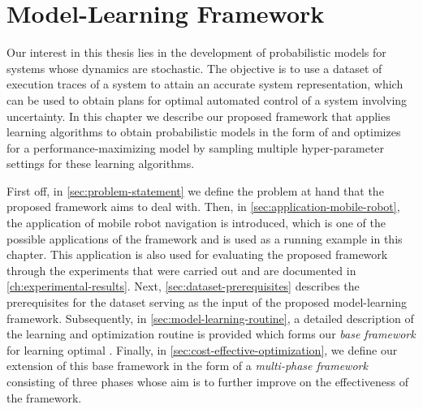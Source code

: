 \chapter{Model-Learning Framework}
\label{ch:methodology}

Our interest in this thesis lies in the development of probabilistic models for systems whose dynamics are stochastic.
The objective is to use a dataset of execution traces of a system to attain an accurate system representation, which can be used to obtain plans for optimal automated control of a system involving uncertainty.
In this chapter we describe our proposed framework that applies learning algorithms to obtain probabilistic models in the form of  and optimizes for a performance-maximizing model by sampling multiple hyper-parameter settings for these learning algorithms.

First off, in \autoref{sec:problem-statement} we define the problem at hand that the proposed framework aims to deal with.
Then, in \autoref{sec:application-mobile-robot}, the application of mobile robot navigation is introduced, which is one of the possible applications of the framework and is used as a running example in this chapter.
This application is also used for evaluating the proposed framework through the experiments that were carried out and are documented in \autoref{ch:experimental-results}.
Next, \autoref{sec:dataset-prerequisites} describes the prerequisites for the dataset serving as the input of the proposed model-learning framework.
Subsequently, in \autoref{sec:model-learning-routine}, a detailed description of the learning and optimization routine is provided which forms our \textit{base framework} for learning optimal .
Finally, in \autoref{sec:cost-effective-optimization}, we define our extension of this base framework in the form of a \textit{multi-phase framework} consisting of three phases whose aim is to further improve on the effectiveness of the framework.

